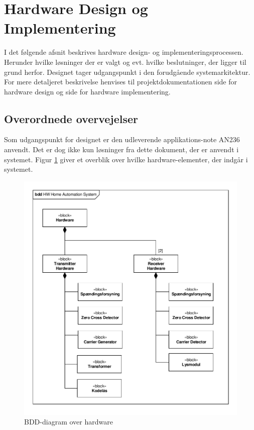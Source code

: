 \newpage
\section{Hardware Design og Implementering}
I det følgende afsnit beskrives hardware design- og implementeringsprocessen. Herunder hvilke løsninger der er valgt og evt. hvilke beslutninger, der ligger til grund herfor. Designet tager udgangspunkt i den forudgående systemarkitektur.\\

For mere detaljeret beskrivelse henvises til projektdokumentationen side \pageref{P-chap:HardwareDesign} for hardware design og side \pageref{P-chap:Hardwareimplementering} for hardware implementering.

\subsection{Overordnede overvejelser}
Som udgangspunkt for designet er den udleverende applikations-note AN236\cite{lib:AN236} anvendt. Det er dog ikke kun løsninger fra dette dokument, der er anvendt i systemet. Figur \ref{fig:HWBDD} giver et overblik over hvilke hardware-elementer, der indgår i systemet.

\begin{figure}[h]
	\centering
	\includegraphics[scale=0.8, trim=10 10 10 10, clip=true]{../Projektdokumentation/HardwareDesign/Diagrammer/BDD_HW.pdf}
	\caption{BDD-diagram over hardware}
	\label{fig:HWBDD}
\end{figure}



